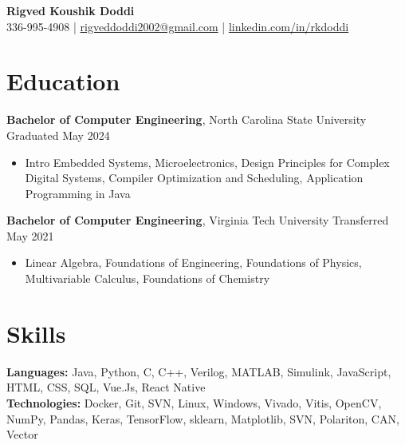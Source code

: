 \documentclass[letterpaper,10pt]{article}
\begin{document}
\begin{center}
    {\Large \textbf{Rigved Koushik Doddi}}\\
    \vspace{2pt}
    \small 336-995-4908 | \href{mailto:rigveddoddi2002@gmail.com}{rigveddoddi2002@gmail.com} | \href{https://www.linkedin.com/in/rkdoddi/}{linkedin.com/in/rkdoddi} \\
\end{center}

\section*{Education}
\noindent \textbf{Bachelor of Computer Engineering}, North Carolina State University \hfill Graduated May 2024
\begin{itemize}[leftmargin=*,itemsep=0pt,topsep=0pt]
    \item Intro Embedded Systems, Microelectronics, Design Principles for Complex Digital Systems, Compiler Optimization and Scheduling, Application Programming in Java
\end{itemize}

\noindent \textbf{Bachelor of Computer Engineering}, Virginia Tech University \hfill Transferred May 2021
\begin{itemize}[leftmargin=*,itemsep=0pt,topsep=0pt]
    \item Linear Algebra, Foundations of Engineering, Foundations of Physics, Multivariable Calculus, Foundations of Chemistry
\end{itemize}

\section*{Skills}
\noindent \textbf{Languages:} Java, Python, C, C++, Verilog, MATLAB, Simulink, JavaScript, HTML, CSS, SQL, Vue.Js, React Native \\
\noindent \textbf{Technologies:} Docker, Git, SVN, Linux, Windows, Vivado, Vitis, OpenCV, NumPy, Pandas, Keras, TensorFlow, sklearn, Matplotlib, SVN, Polariton, CAN, Vector

\end{document}
